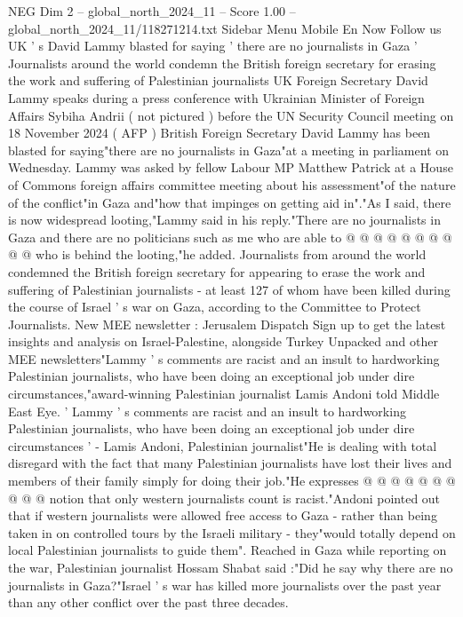 \begin{textsample}{NEG Dim 2 – global\_north\_2024\_11 – Score 1.00 – global\_north\_2024\_11/118271214.txt}  \label{ex:f2_neg_188}
Sidebar Menu Mobile En Now Follow us UK ' s David Lammy blasted for saying ' there are no journalists in Gaza ' Journalists around the world condemn the British foreign secretary for erasing the work and suffering of Palestinian journalists UK Foreign Secretary David Lammy speaks during a press conference with Ukrainian Minister of Foreign Affairs Sybiha Andrii ( not pictured ) before the UN Security Council meeting on 18 November 2024 ( AFP ) British Foreign Secretary David Lammy has been blasted for saying"there are no journalists in Gaza"at a meeting in parliament on Wednesday.
Lammy was asked by fellow Labour MP Matthew Patrick at a House of Commons foreign affairs committee meeting about his assessment"of the nature of the conflict"in Gaza and"how that impinges on getting aid in"."As I said, there is now widespread looting,"Lammy said in his reply."There are no journalists in Gaza and there are no politicians such as me who are able to @ @ @ @ @ @ @ @ @ @ who is behind the looting,"he added.
Journalists from around the world condemned the British foreign secretary for appearing to erase the work and suffering of Palestinian journalists - at least 127 of whom have been killed during the course of Israel ' s war on Gaza, according to the Committee to Protect Journalists.
New MEE newsletter : Jerusalem Dispatch Sign up to get the latest insights and analysis on Israel-Palestine, alongside Turkey Unpacked and other MEE newsletters"Lammy ' s comments are racist and an insult to hardworking Palestinian journalists, who have been doing an exceptional job under dire circumstances,"award-winning Palestinian journalist Lamis Andoni told Middle East Eye. ' Lammy ' s comments are racist and an insult to hardworking Palestinian journalists, who have been doing an exceptional job under dire circumstances ' - Lamis Andoni, Palestinian journalist"He is dealing with total disregard with the fact that many Palestinian journalists have lost their lives and members of their family simply for doing their job."He expresses @ @ @ @ @ @ @ @ @ @ notion that only western journalists count is racist."Andoni pointed out that if western journalists were allowed free access to Gaza - rather than being taken in on controlled tours by the Israeli military - they"would totally depend on local Palestinian journalists to guide them".
Reached in Gaza while reporting on the war, Palestinian journalist Hossam Shabat said :"Did he say why there are no journalists in Gaza?"Israel ' s war has killed more journalists over the past year than any other conflict over the past three decades.

\end{textsample}
